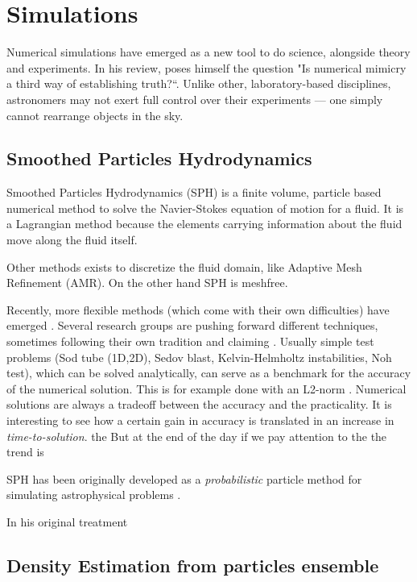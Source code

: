 \chapter{Simulations}
\label{ch:simulations}

Numerical simulations have emerged as a new tool to do science, alongside theory and experiments.
In his review, \cite{Heng2014} poses himself the question "Is numerical mimicry a third way of establishing truth?``. Unlike other, laboratory-based disciplines, astronomers may not exert full control over their experiments — one simply cannot rearrange objects in the sky.




\section{Smoothed Particles Hydrodynamics}
Smoothed Particles Hydrodynamics (SPH) is a finite volume, particle based numerical method to solve the Navier-Stokes equation of motion for a fluid.
It is a Lagrangian method because the elements carrying information about the fluid move along the fluid itself.

Other methods exists to discretize the fluid domain, like Adaptive Mesh Refinement (AMR).
On the other hand SPH is meshfree.

Recently, more flexible methods (which come with their own difficulties) have emerged \citep{Springel2010, Shadowfax}.
Several research groups are pushing forward different techniques, sometimes following their own tradition and claiming . 
Usually simple test problems (Sod tube (1D,2D), Sedov blast, Kelvin-Helmholtz instabilities, Noh test), which can be solved analytically, can serve as a benchmark for the accuracy of the numerical solution. This is for example done with an L2-norm \citep{Borrow}.
Numerical solutions are always a tradeoff between the accuracy and the practicality.
It is interesting to see how a certain gain in accuracy is translated in an increase in \emph{time-to-solution}. the But at the end of the day if we pay attention to the the trend is 

SPH has been originally developed as a \emph{probabilistic} particle method for simulating astrophysical problems \citep{Lucy1977, Gingold1977}.

In his original treatment 




\section{Density Estimation from particles ensemble}

